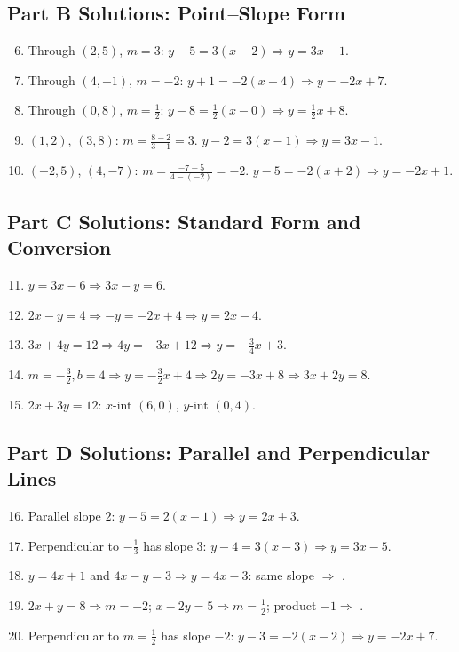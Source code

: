 \documentclass[14pt]{extarticle}
\begin{document}
\subsection*{Part B Solutions: Point–Slope Form}
\begin{enumerate}
    \setcounter{enumi}{5}
    \item Through \((2,5)\), \(m=3\): \(y-5=3(x-2)\Rightarrow \boxed{y=3x-1}\).
    \item Through \((4,-1)\), \(m=-2\): \(y+1=-2(x-4)\Rightarrow \boxed{y=-2x+7}\).
    \item Through \((0,8)\), \(m=\tfrac12\): \(y-8=\tfrac12(x-0)\Rightarrow \boxed{y=\tfrac12 x+8}\).
    \item \((1,2)\), \((3,8)\): \(m=\frac{8-2}{3-1}=3\). \(y-2=3(x-1)\Rightarrow \boxed{y=3x-1}\).
    \item \((-2,5)\), \((4,-7)\): \(m=\frac{-7-5}{4-(-2)}=-2\). \(y-5=-2(x+2)\Rightarrow \boxed{y=-2x+1}\).
\end{enumerate}

\subsection*{Part C Solutions: Standard Form and Conversion}
\begin{enumerate}
    \setcounter{enumi}{10}
    \item \(y=3x-6 \Rightarrow \boxed{3x - y = 6}\).
    \item \(2x-y=4 \Rightarrow -y=-2x+4 \Rightarrow \boxed{y=2x-4}\).
    \item \(3x+4y=12 \Rightarrow 4y=-3x+12 \Rightarrow \boxed{y=-\tfrac34 x + 3}\).
    \item \(m=-\tfrac32, b=4\Rightarrow y=-\tfrac32 x+4 \Rightarrow 2y=-3x+8 \Rightarrow \boxed{3x+2y=8}\).
    \item \(2x+3y=12\): \(x\)-int \((6,0)\), \(y\)-int \((0,4)\).
\end{enumerate}

\subsection*{Part D Solutions: Parallel and Perpendicular Lines}
\begin{enumerate}
    \setcounter{enumi}{15}
    \item Parallel slope \(2\): \(y-5=2(x-1)\Rightarrow \boxed{y=2x+3}\).
    \item Perpendicular to \(-\tfrac13\) has slope \(3\): \(y-4=3(x-3)\Rightarrow \boxed{y=3x-5}\).
    \item \(y=4x+1\) and \(4x-y=3\Rightarrow y=4x-3\): same slope \(\Rightarrow\) .
    \item \(2x+y=8 \Rightarrow m=-2\); \(x-2y=5 \Rightarrow m=\tfrac12\); product \(-1\Rightarrow\) .
    \item Perpendicular to \(m=\tfrac12\) has slope \(-2\): \(y-3=-2(x-2)\Rightarrow \boxed{y=-2x+7}\).
\end{enumerate}
\end{document}
